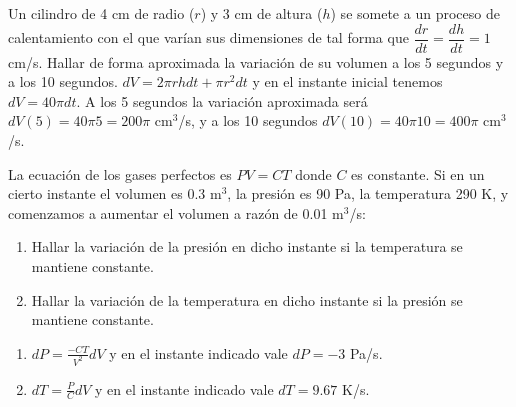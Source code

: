 
{Un cilindro de 4 cm de radio ($r$) y 3 cm de altura ($h$) se somete a un proceso de calentamiento con el que varían sus dimensiones de tal
forma que $\dfrac{dr}{dt}=\dfrac{dh}{dt}= 1$ cm/s. Hallar de forma aproximada la variación de su volumen a los 5 segundos y a los
10 segundos.
}
{$dV = 2\pi r h dt + \pi r^2 dt$ y en el instante inicial tenemos $dV = 40\pi dt$. A los 5 segundos la variación aproximada será $dV(5) = 40\pi 5 = 200\pi$ cm$^3$/s, y a los 10 segundos $dV(10) = 40\pi 10 = 400\pi$ cm$^3$/s.
}
{
}


{La ecuación de los gases perfectos es $PV=CT$ donde $C$ es constante. Si en un cierto instante el volumen es 0.3 m$^3$, la presión es 90 Pa, la temperatura 290 K, y comenzamos a aumentar el volumen a razón de 0.01 m$^3$/s:
\begin{enumerate}
   \item  Hallar la variación de la presión en dicho instante si
   la temperatura se mantiene constante.

   \item  Hallar la variación de la temperatura en dicho instante si
   la presión se mantiene constante.
\end{enumerate}
}
{\begin{enumerate}
\item $dP = \frac{-CT}{V^2}dV$ y en el instante indicado vale $dP = -3 $ Pa/s.
\item $dT = \frac{P}{C} dV$ y en el instante indicado vale $dT = 9.67$ K/s.  
\end{enumerate}
}
{
}
